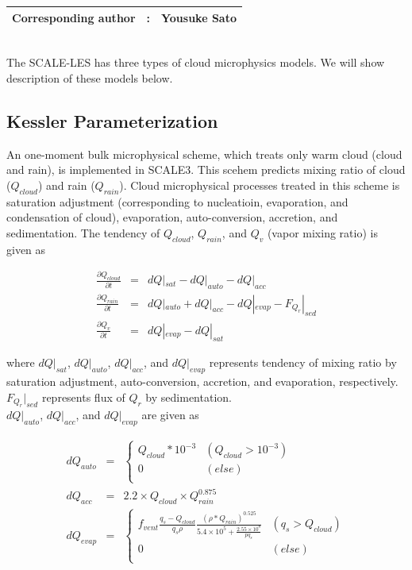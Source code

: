 {\bf \Large 
\begin{tabular}{ccc}
\hline
  Corresponding author & : & Yousuke Sato\\
\hline
\end{tabular}
}
\\
 The SCALE-LES has three types of cloud microphysics models. We will show description of these models below.

\subsection{Kessler Parameterization}
An one-moment bulk microphysical scheme, which treats only warm cloud (cloud and rain), is implemented in SCALE3. This scehem predicts mixing ratio of cloud ($Q_{cloud}$) and rain ($Q_{rain}$). Cloud microphysical processes treated in this scheme is saturation adjustment (corresponding to nucleatioin, evaporation, and condensation of cloud), evaporation, auto-conversion, accretion, and sedimentation. The tendency of $Q_{cloud}$, $Q_{rain}$, and $Q_{v}$ (vapor mixing ratio) is given as

\begin{eqnarray}
\frac{\partial Q_{cloud}}{\partial t}&=&dQ|_{sat}-dQ|_{auto}-dQ|_{acc}\\
\frac{\partial Q_{rain}}{\partial t}&=&dQ|_{auto}+dQ|_{acc}-dQ|_{evap}-F_{Q_{r}}|_{sed}\\
\frac{\partial Q_{v}}{\partial t}&=&dQ|_{evap}-dQ|_{sat}
\end{eqnarray}

where $dQ|_{sat}$, $dQ|_{auto}$, $dQ|_{acc}$, and $dQ|_{evap}$ represents tendency of mixing ratio by saturation adjustment, auto-conversion, accretion, and evaporation, respectively. $F_{Q_{r}}|_{sed}$ represents flux of $Q_{r}$ by sedimentation.\\ $dQ|_{auto}$, $dQ|_{acc}$, and $dQ|_{evap}$ are given as

\begin{eqnarray}
dQ_{auto}&=&\left\{
\begin{array}{ll}
Q_{cloud}*10^{-3} & (Q_{cloud}>10^{-3})\\
0 & (else)\\
\end{array}\right.\\
dQ_{acc}&=&2.2\times Q_{cloud}\times Q_{rain}^{0.875}\\
dQ_{evap}&=&\left\{
\begin{array}{ll}
f_{vent} \frac{q_{s}-Q_{cloud}}{q_{s}\rho}\frac{(\rho*Q_{rain})^{0.525}}{5.4\times 10^{5}+\frac{2.55\times 10^{8}}{pq_{s}}} & ( q_{s} > Q_{cloud})\\
0 & (else)\\
\end{array} \right.
\end{eqnarray}

